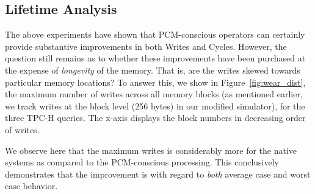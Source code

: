 \begin{comment}

The data at this stage of the group-by was about 6 MB. Using the bounds
derived in Equations \ref{eq:gby_conv_sort} and \ref{eq:gby_ptr_hybrid},
the write ratios of the native and PCM-conscious algorithms would be
within $\frac{ \frac{2 \times size_{ptr}}{N_R L_R} + 1}{2+ln\frac{N_R
L_R}{|DRAM|} + 1} = \frac{1}{3+ln\frac {6M}{4M} } \approx 29\%$, which
is in accordance with the empirical savings of 74\%.

\end{comment}

\begin{figure*}[htbp]
\centering

\caption{Queries wear distribution }
\label{fig:wear_dist}
\end{figure*}



\subsection{Lifetime Analysis}
\begin{comment}
In \cite{qureshi}, the ideal lifetime $Y$ of a PCM device with size $S$
GB, $B$ write traffic, and cell endurance $W_{max}$, is given by:

$Y(years) = \frac{W_{max} \times S}{B} \times 2^{-25}$\\
\end{comment}

The above experiments have shown that PCM-conscious operators
can certainly provide substantive improvements in both Writes and
Cycles. However, the question still remains as to whether these
improvements have been purchased at the expense of \emph{longevity} of
the memory. That is, are the writes skewed towards particular memory
locations?  To answer this, we show in Figure~\ref{fig:wear_dist}, the
maximum number of writes  across all memory blocks (as mentioned earlier,
we track writes at the block level (256 bytes) in our modified simulator),
for the three TPC-H queries. The x-axis displays the block numbers in
decreasing order of writes.

We observe here that the maximum writes is considerably more for the
native systems as compared to the PCM-conscious processing. This
conclusively demonstrates that the improvement is with regard to
\emph{both} average case and worst case behavior.


